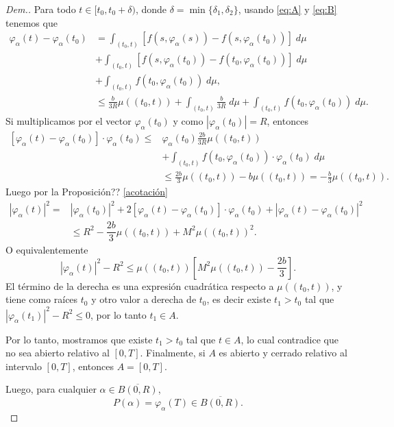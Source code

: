 \begin{proof}[Dem.]
Para todo $t\in[t_0,t_0+\delta)$, donde $\delta=\min\{\delta_1,\delta_2\}$, usando \eqref{eq:A} y \eqref{eq:B} tenemos que 
\begin{equation*}
    \begin{split}
    \varphi_\alpha(t)-\varphi_\alpha(t_0) &= \int_{(t_0,t)}\left[f(s,\varphi_\alpha(s))-f(s,\varphi_\alpha(t_0))\right]\; d\mu\\& + \int_{(t_0,t)}\left[f(s,\varphi_\alpha(t_0))-f(t_0,\varphi_\alpha(t_0))\right]\; d\mu \\&+ \int_{(t_0,t)}f(t_0,\varphi_\alpha(t_0))\; d\mu,\\
& \leq \frac{b}{3R}\mu((t_0,t)) + \int_{(t_0,t)}\frac{b}{3R}\; d\mu + \int_{(t_0,t)}f(t_0,\varphi_\alpha(t_0))\; d\mu.
\end{split}
\end{equation*}		 
Si multiplicamos por el vector $\varphi_\alpha(t_0)$ y como $|\varphi_\alpha(t_0)|=R$, entonces
\begin{equation*}
\begin{split}
\left[\varphi_\alpha(t)-\varphi_\alpha(t_0)\right]\cdot \varphi_\alpha(t_0) \leq & \varphi_\alpha(t_0)\frac{2b}{3R}\mu((t_0,t))\\& + \int_{(t_0,t)}f(t_0,\varphi_\alpha(t_0))\cdot \varphi_\alpha(t_0)\; d\mu\\
&\leq \frac{2b}{3}\mu((t_0,t))-b\mu((t_0,t))=-\frac{b}{3}\mu((t_0,t)).
\end{split}
\end{equation*}
Luego por la Proposición?? \eqref{acotación}
\begin{equation*}
    \begin{split}
    |\varphi_\alpha(t)|^2=&|\varphi_\alpha(t_0)|^2+2\left[\varphi_\alpha(t)-\varphi_\alpha(t_0)\right]\cdot\varphi_\alpha(t_0)+|\varphi_\alpha(t)-\varphi_\alpha(t_0)|^2\\
   &\leq R^2-\dfrac{2b}{3}\mu((t_0,t))+M^2 \mu((t_0,t))^2.  
    \end{split}
\end{equation*}
O equivalentemente
\begin{equation}
    |\varphi_\alpha(t)|^2-R^2\leq \mu((t_0,t))\left[M^2 \mu((t_0,t))-\dfrac{2b}{3}\right]. 
\end{equation}
El término de la derecha es una expresión cuadrática respecto a $\mu((t_0,t))$, y tiene como raíces $t_0$ y  otro valor a derecha de $t_0$, es decir existe $t_1>t_0$ tal que $|\varphi_\alpha(t_1)|^2-R^2\leq 0$, por lo tanto $t_1\in A$.
  		
Por lo tanto, mostramos que existe $t_1>t_0$ tal que $t\in A$, lo cual contradice que no sea abierto relativo al $[0,T]$. Finalmente, si $A$ es abierto y cerrado relativo al intervalo $[0,T]$, entonces $A=[0,T]$.
 	
Luego, para cualquier $\alpha\in\overline{B(0,R)}$, $$P(\alpha)=\varphi_\alpha(T)\in\overline{B(0,R)}.$$ 
 \end{proof}
 
